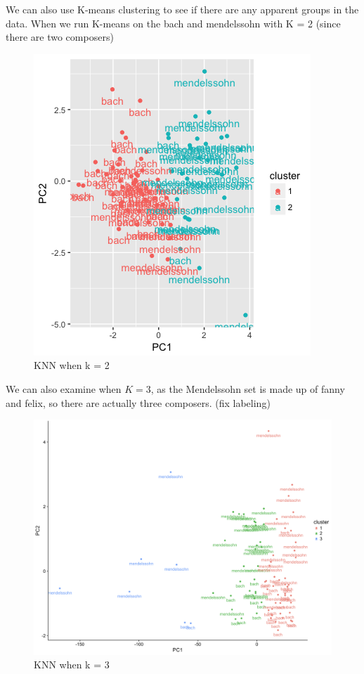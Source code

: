 \documentclass[12pt,twoside]{reedthesis}
\theoremstyle{definition}
\theoremstyle{definition}
\theoremstyle{definition}
\theoremstyle{remark}
\begin{document}
We can also use K-means clustering to see if there are any apparent
groups in the data. When we run K-means on the bach and mendelssohn with
K = 2 (since there are two composers)
\begin{figure}[h]
\centering
\includegraphics[scale = .3]{images/Kmeanspca.png}
\caption{KNN when k = 2}
\label{subd}
\end{figure}
We can also examine when \(K=3\), as the Mendelssohn set is made up of
fanny and felix, so there are actually three composers. (fix labeling)
\begin{figure}[h]
\centering
\includegraphics[scale = .3]{images/k3.png}
\caption{KNN when k = 3}
\label{subd}
\end{figure}
\end{document}
